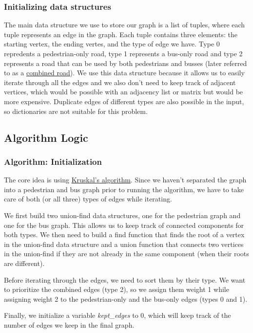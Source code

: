 \documentclass[a4paper]{article}
\begin{document}
\subsubsection*{Initializing data structures}
The main data structure we use to store our graph is a list of tuples, where each tuple represents an edge in the graph. Each tuple contains three elements: the starting vertex, the ending vertes, and the type of edge we have. Type 0 repredents a pedestrian-only road, type 1 represents a bus-only road and type 2 represents a road that can be used by both pedestrians and busses (later referred to as a \underline{combined road}). We use this data structure because it allows us to easily iterate through all the edges and we also don't need to keep track of adjacent vertices, which would be possible with an adjacency list or matrix but would be more expensive. Duplicate edges of different types are also possible in the input, so dictionaries are not suitable for this problem.


\subsection{Algorithm Logic}

\subsubsection*{Algorithm: Initialization}
The core idea is using \underline{Kruskal's algorithm}. Since we haven't separated the graph into a pedestrian and bus graph prior to running the algorithm, we have to take care of both (or all three) types of edges while iterating.

We first build two union-find data structures, one for the pedestrian graph and one for the bus graph. This allows us to keep track of connected components for both types. We then need to build a find function that finds the root of a vertex in the union-find data structure and a union function that connects two vertices in the union-find if they are not already in the same component (when their roots are different).

Before iterating through the edges, we need to sort them by their type. We want to prioritize the combined edges (type 2), so we assign them weight 1 while assigning weight 2 to the pedestrian-only and the bus-only edges (types 0 and 1). 

Finally, we initialize a variable \textsl{kept\_edges} to 0, which will keep track of the number of edges we keep in the final graph.
\end{document}
